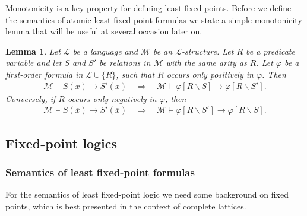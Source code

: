 \documentclass[acmsmall]{acmart}
\theoremstyle{plain}
\newtheorem{lemma}[theorem]{Lemma}
\theoremstyle{definition}
\newcommand{\calL}{\mathcal{L}}
\newcommand{\calM}{\mathcal{M}}
\newcommand{\mybar}[1]{\overline{#1}}
\begin{document}
Monotonicity is a key property for defining least fixed-points.
Before we define the semantics of atomic least fixed-point formulas we state a simple
 monotonicity lemma that will be useful at several occasion later on.
%
\begin{lemma}\label{lem.ImplPositiv}
	Let $\calL$ be a language and $\calM$ be an $\calL$-structure. Let $R$ be a predicate variable and let $S$ and $S'$ be relations in $\calM$ with the same arity as $R$. Let $\varphi$ be a first-order formula in $\calL \cup \{R\}$, such that $R$ occurs only positively in $\varphi$. Then
	\begin{align*}
		\calM \models S(\mybar{x}) \rightarrow S'(\mybar{x}) \quad \Rightarrow \quad \calM \models \varphi[R \backslash S] \rightarrow \varphi[R \backslash S'].
	\end{align*}
	Conversely, if $R$ occurs only negatively in $\varphi$, then
	\begin{align*}
		\calM \models S(\mybar{x}) \rightarrow S'(\mybar{x}) \quad \Rightarrow \quad \calM \models \varphi[R \backslash S'] \rightarrow \varphi[R \backslash S].
	\end{align*}
\end{lemma}



\subsection{Fixed-point logics}

\subsubsection{Semantics of least fixed-point formulas}
%
For the semantics of least fixed-point logic we need some background on fixed points, which
 is best presented in the context of complete lattices.
\end{document}
